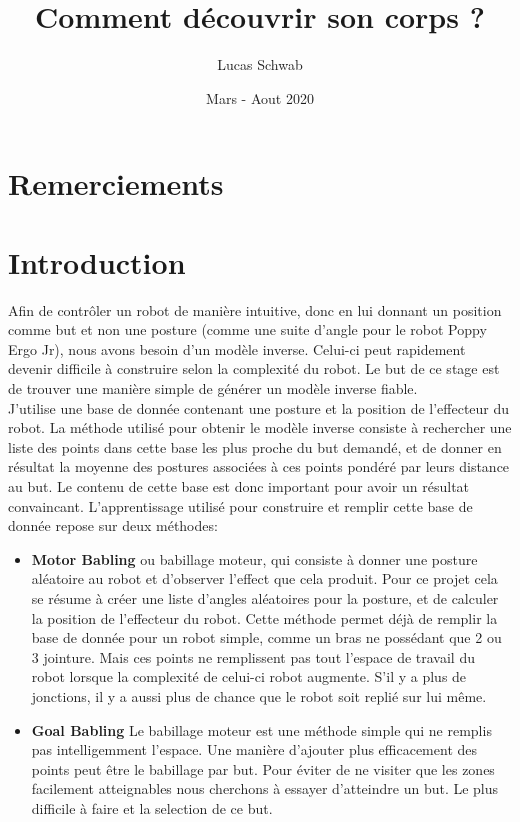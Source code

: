 \documentclass[11pt,french]{article}
\title{Comment découvrir son corps ?}
\author{Lucas Schwab}
\date{Mars - Aout 2020}
\begin{document}
\maketitle

\tableofcontents

\section{Remerciements}

\section{Introduction}

Afin de contrôler un robot de manière intuitive, donc en lui donnant un position comme but et non une posture (comme une suite d'angle pour le robot Poppy Ergo Jr), nous avons besoin d'un modèle inverse. Celui-ci peut rapidement devenir difficile à construire selon la complexité du robot. Le but de ce stage est de trouver une manière simple de générer un modèle inverse fiable.\\
J'utilise une base de donnée contenant une posture et la position de l'effecteur du robot. La méthode utilisé pour obtenir le modèle inverse consiste à rechercher une liste des points dans cette base les plus proche du but demandé, et de donner en résultat la moyenne des postures associées à ces points pondéré par leurs distance au but. Le contenu de cette base est donc important pour avoir un résultat convaincant. L'apprentissage utilisé pour construire et remplir cette base de donnée repose sur deux méthodes:
\begin{itemize}
    \item \textbf{Motor Babling} ou babillage moteur, qui consiste à donner une posture aléatoire au robot et d'observer l'effect que cela produit. Pour ce projet cela se résume à créer une liste d'angles aléatoires pour la posture, et de calculer la position de l'effecteur du robot. Cette méthode permet déjà de remplir la base de donnée pour un robot simple, comme un bras ne possédant que 2 ou 3 jointure. Mais ces points ne remplissent pas tout l'espace de travail du robot lorsque la complexité de celui-ci robot augmente. S'il y a plus de jonctions, il y a aussi plus de chance que le robot soit replié sur lui même.
    \item \textbf{Goal Babling} Le babillage moteur est une méthode simple qui ne remplis pas intelligemment l'espace. Une manière d'ajouter plus efficacement des points peut être le babillage par but. Pour éviter de ne visiter que les zones facilement atteignables nous cherchons à essayer d'atteindre un but. Le plus difficile à faire et la selection de ce but.
\end{itemize}
\end{document}
